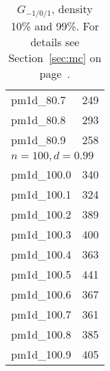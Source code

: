\documentclass[a4paper, 12pt]{article}
\begin{document}
\begin{table}
\begin{center}
\begin{minipage}{30ex}
\begin{tabular}{|l|r|}
pm1d\_80.7 & 249 \\
pm1d\_80.8 & 293 \\
pm1d\_80.9 & 258 \\
\hline
\multicolumn{2}{|l|}{$n=100, d=0.99$}\\
\hline
pm1d\_100.0 & 340 \\
pm1d\_100.1 & 324 \\
pm1d\_100.2 & 389 \\
pm1d\_100.3 & 400 \\
pm1d\_100.4 & 363 \\
pm1d\_100.5 & 441 \\
pm1d\_100.6 & 367 \\
pm1d\_100.7 & 361 \\
pm1d\_100.8 & 385 \\
pm1d\_100.9 & 405 \\
\hline
\end{tabular}
\end{minipage}
\caption{$G_{-1/0/1}$, density 10\% and 99\%. For details see
  Section~\ref{sec:mc} on page~\pageref{sec:mc}.} \label{tab:pm1} 
\end{center} \end{table}
\end{document}

